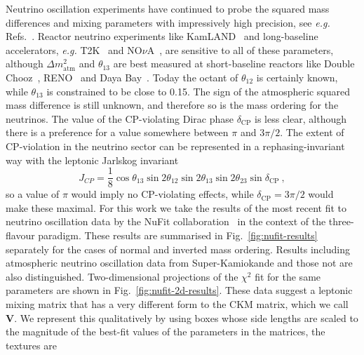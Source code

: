   Neutrino oscillation experiments have continued to probe the squared mass
  differences and mixing parameters with impressively high precision, see
  \textit{e.g.} Refs.~\cite{Capozzi:2017ipn, Esteban:2020cvm}. Reactor neutrino
  experiments like KamLAND~\cite{Eguchi:2002dm} and long-baseline accelerators,
  \textit{e.g.} T2K~\cite{Abe:2015awa} and NO$\nu$A~\cite{Adamson:2017qqn}, are
  sensitive to all of these parameters, although $\Delta m^{2}_{\text{atm}}$ and
  $\theta_{13}$ are best measured at short-baseline reactors like Double
  Chooz~\cite{Ardellier:2006mn}, RENO~\cite{Ahn:2010vy} and Daya
  Bay~\cite{An:2015qga}. Today the octant of $\theta_{12}$ is certainly known,
  while $\theta_{13}$ is constrained to be close to 0.15. The sign of the
  atmospheric squared mass difference is still unknown, and therefore so is the
  mass ordering for the neutrinos. The value of the CP-violating Dirac phase
  $\delta_{\text{CP}}$ is less clear, although there is a preference for a value
  somewhere between $\pi$ and $3\pi/2$. The extent of CP-violation in the
  neutrino sector can be represented in a rephasing-invariant way with the
  leptonic Jarlskog invariant
  \begin{equation}
    J_{CP} = \frac{1}{8} \cos \theta_{13} \sin 2\theta_{12} \sin 2\theta_{13} \sin 2\theta_{23} \sin \delta_{\text{CP}} \ ,
  \end{equation}
  so a value of $\pi$ would imply no CP-violating effects, while
  $\delta_{\text{CP}} = 3\pi/2$ would make these maximal. For this work we take
  the results of the most recent fit to neutrino oscillation data by the NuFit
  collaboration~\cite{Esteban:2020cvm, nufitweb} in the context of the
  three-flavour paradigm. These results are summarised in
  Fig.~\ref{fig:nufit-results} separately for the cases of normal and inverted
  mass ordering. Results including atmospheric neutrino oscillation data from
  Super-Kamiokande and those not are also distinguished. Two-dimensional
  projections of the $\chi^{2}$ fit for the same parameters are shown in
  Fig.~\ref{fig:nufit-2d-results}. These data suggest a leptonic mixing matrix
  that has a very different form to the CKM matrix, which we call $\mathbf{V}$.
  We represent this qualitatively by using boxes whose side lengths are scaled
  to the magnitude of the best-fit values of the parameters in the matrices, the
  textures are
